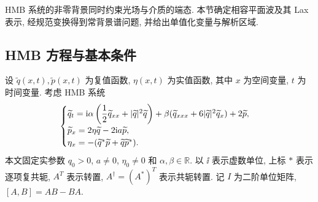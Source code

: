 
HMB 系统的非零背景同时约束光场与介质的端态. 本节确定相容平面波及其 Lax 表示,
经规范变换得到常背景谱问题, 并给出单值化变量与解析区域.

\subsection{HMB 方程与基本条件}\label{ass:fields}
设 $\widetilde q(x,t),\widetilde p(x,t)$ 为复值函数, $\eta(x,t)$ 为实值函数,
其中 $x$ 为空间变量, $t$ 为时间变量. 考虑 HMB 系统
\begin{equation}\label{eq:HMB}
\begin{cases}
\widetilde q_t=\mathrm{i}\alpha\left(\dfrac{1}{2}\widetilde q_{xx}+|\widetilde q|^2\widetilde q\right)
+\beta(\widetilde q_{xxx}+6|\widetilde q|^2\widetilde q_x)+2\widetilde p,\\
\widetilde p_x=2\eta\widetilde q-2\mathrm{i} a\widetilde p,\\
\eta_x=-({\widetilde q}^{*}\widetilde p+\widetilde q{\widetilde p}^{*}).
\end{cases}
\end{equation}
本文固定实参数 $q_0>0$, $a\ne0$, $\eta_0\ne0$ 和 $\alpha,\beta\in\mathbb R$.
以 $\ii$ 表示虚数单位, 上标 $*$ 表示逐项复共轭, $A^T$ 表示转置,
$A^\dagger=(A^*)^T$ 表示共轭转置. 记 $I$ 为二阶单位矩阵, $[A,B]=AB-BA$.

